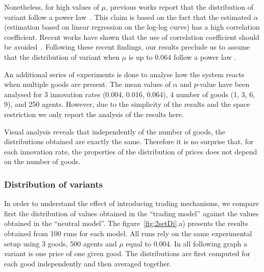 \documentclass[a4paper]{article}
\begin{document}
Nonetheless, for high values of $\mu$, previous works report that the distribution of variant follow a power law~\cite{bentley_random_2004}. This claim is based on the fact that the estimated $\alpha$ (estimation based on linear regression on the log-log curve) has a high correlation coefficient. Recent works have shown that the use of correlation coefficient should be avoided~\cite{clauset2009powerlawdistributionsinempiricaldat}. Following these recent findings, our results preclude us to assume that the distribution of variant when $\mu$ is up to $0.064$ follow a power law . 

An additional series of experiments is done to analyse how the system reacts when multiple goods are present. The mean values of $\alpha$ and $p$-value have been analysed for 3 innovation rates (0.004, 0.016, 0.064), 4 number of goods (1, 3, 6, 9), and 250 agents. However, due to the simplicity of the results and the space restriction we only report the analysis of the results here. 

Visual analysis reveals that independently of the number of goods, the distributions obtained are exactly the same. Therefore it is no surprise that, for each innovation rate, the properties of the distribution of prices does not depend on the number of goods.


\subsubsection{Distribution of variants}

In order to understand the effect of introducing trading mechanisms, we compare first the distribution of values obtained in the ``trading model'' against the values obtained in the ``neutral model''. The figure~\ref{fig:2setDi}.a) presents the results obtained from 100 runs for each model. All runs rely on the same experimental setup using 3 goods, 500 agents and $\mu$ equal to 0.004. In all following graph  a variant is one price of one given good. The distributions are first computed for each good independently and then averaged together.
\end{document}
